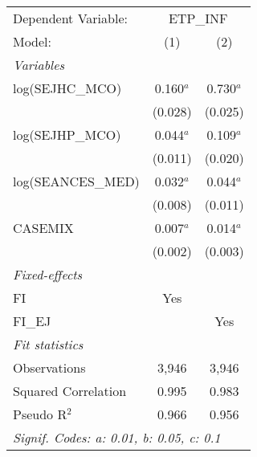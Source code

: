 
\begingroup
\centering
\begin{tabular}{lcc}
   \tabularnewline \midrule \midrule
   Dependent Variable: & \multicolumn{2}{c}{ETP\_INF}\\
   Model:              & (1)         & (2)\\  
   \midrule
   \emph{Variables}\\
   log(SEJHC\_MCO)     & 0.160$^{a}$ & 0.730$^{a}$\\   
                       & (0.028)     & (0.025)\\   
   log(SEJHP\_MCO)     & 0.044$^{a}$ & 0.109$^{a}$\\   
                       & (0.011)     & (0.020)\\   
   log(SEANCES\_MED)   & 0.032$^{a}$ & 0.044$^{a}$\\   
                       & (0.008)     & (0.011)\\   
   CASEMIX             & 0.007$^{a}$ & 0.014$^{a}$\\   
                       & (0.002)     & (0.003)\\   
   \midrule
   \emph{Fixed-effects}\\
   FI                  & Yes         & \\  
   FI\_EJ              &             & Yes\\  
   \midrule
   \emph{Fit statistics}\\
   Observations        & 3,946       & 3,946\\  
   Squared Correlation & 0.995       & 0.983\\  
   Pseudo R$^2$        & 0.966       & 0.956\\  
   \midrule \midrule
   \multicolumn{3}{l}{\emph{Signif. Codes: a: 0.01, b: 0.05, c: 0.1}}\\
\end{tabular}
\par\endgroup


